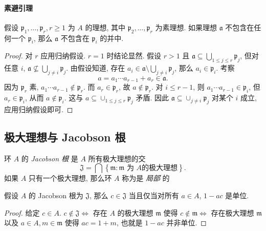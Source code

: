 \paragraph{素避引理}

\begin{proposition}[素避]
  假设 \( \mathfrak{p}_1, \ldots, \mathfrak{p}_r, r \geq 1 \) 为 \( A \) 的理想,
  其中 \( \mathfrak{p}_2, \ldots, \mathfrak{p}_r \) 为素理想. 如果理想 \(
  \mathfrak{a} \) 不包含在任何一个 \( \mathfrak{p}_i \), 那么 \( \mathfrak{a} \)
  不包含在 \( \mathfrak{p}_i \) 的并中.
\end{proposition}
\begin{proof}
  对 \( r \) 应用归纳假设.
  \( r = 1 \) 时结论显然.
  假设 \( r > 1 \) 且 \( \mathfrak{a} \subseteq \bigcup_{1 \leq j \leq r}
  \mathfrak{p}_j \), 但对任意 \( i \), \( \mathfrak{a} \not\subseteq \bigcup_{j
  \neq i}\mathfrak{p}_j \).
  由假设知道,
  存在 \( a_i \in \mathfrak{a} \setminus \bigcup_{j \neq i} \mathfrak{p}_j \),
  那么 \( a_i \in \mathfrak{p}_i \). 考察
  \[
    a = a_1 \cdots a_{r - 1} + a_r \in \mathfrak{a}.
  \]
  因为 \( \mathfrak{p}_r \) 素, \( a_1 \cdots a_{r - 1} \notin \mathfrak{p}_r
  \). 而 \( a_{r} \in \mathfrak{p}_r \), 故 \( a \notin \mathfrak{p}_r \).
  对 \( i \leq r - 1 \), 则 \( a_1 \cdots a_{r - 1} \in \mathfrak{p}_{i} \), 但
  \( a_r \in \mathfrak{p}_i \), 从而 \( a \notin \mathfrak{p}_i \). 这与 \( a
  \subseteq \cup_{1 \leq j \leq r} \mathfrak{p}_j \) 矛盾.
  因此 \( \mathfrak{a} \subseteq \cup_{j \neq i} \mathfrak{p}_j \) 对某个 \( i
  \) 成立, 应用归纳假设即可.
\end{proof}

\subsection{极大理想与 Jacobson 根}

环 \( A \) 的 \emph{Jacobson 根} 是 \( A \) 所有极大理想的交
\[
  \mathfrak{J} = \bigcap \left\lbrace \mathfrak{m}: \mathfrak{m} \text{ 为 } A
  \text{的极大理想} \right\rbrace.
\]
如果 \( A \) 只有一个极大理想, 那么环 \( A \) 称为是 \emph{局部} 的

\begin{proposition}
  \label{proposition-Jacobson-root-iff-condition}
  假设 \( A \) 的 Jacobson 根为 \( \mathfrak{J} \), 那么 \( c \in \mathfrak{J}
  \) 当且仅当对所有 \( a \in A \), \( 1 - ac \) 是单位.
\end{proposition}
\begin{proof}
  给定 \( c \in A \).
  \( c \notin \mathfrak{J} \iff \) 存在 \( A \) 的极大理想 \( \mathfrak{m} \)
  使得 \( c \notin \mathfrak{m} \iff \) 存在极大理想 \( \mathfrak{m} \) 以及 \(
  a \in A, m \in \mathfrak{m} \) 使得 \( ac = 1 + m \), 也就是 \( 1 - ac \)
  并非单位.
\end{proof}

